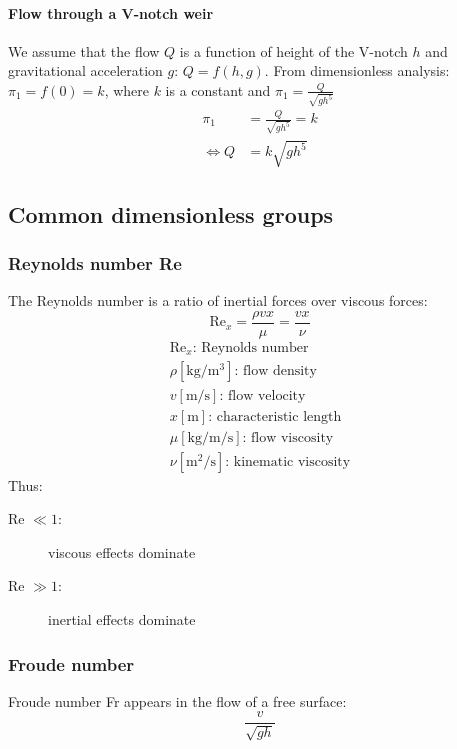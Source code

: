 \documentclass[10pt, twocolumn]{article}
\begin{document}
\paragraph{Flow through a V-notch weir}
We assume that the flow \(Q\) is a function of height of the V-notch \(h\) and gravitational acceleration \(g\): \(Q = f(h, g)\).
From dimensionless analysis: \(\pi_1 = f(0) = k\), where \(k\) is a constant and
\(\pi_1 = \frac{Q}{\sqrt{gh^5}}\)
\[
  \begin{split}
    \pi_1 & = \frac{Q}{\sqrt{gh^5}} = k \\
    \iff Q & = k\sqrt{gh^5}
  \end{split}
\]


\subsection{Common dimensionless groups}
\subsubsection{Reynolds number Re}
The Reynolds number is a ratio of inertial forces over viscous forces:
\[
  \mathrm{Re}_x = \frac{\rho v x}{\mu} = \frac{v x}{\nu}
\]
\[
  \begin{array}{|l}
    \mathrm{Re}_x \text{: Reynolds number}                            \\
    \rho [\si{\kilogram\per\metre\cubed}] \text{: flow density}       \\
    v [\si{\metre\per\second}] \text{: flow velocity}                 \\
    x [\si{\metre}] \text{: characteristic length}                    \\
    \mu [\si{\kilogram\per\meter\per\second}] \text{: flow viscosity} \\
    \nu [\si{\meter\squared\per\second}] \text{: kinematic viscosity}
  \end{array}
\]
Thus:
\begin{description}
  \item[Re \(\ll 1\):] viscous effects dominate
  \item[Re \(\gg 1\):] inertial effects dominate
\end{description}

\subsubsection{Froude number}
Froude number Fr appears in the flow of a free surface:
\[
  \frac{v}{\sqrt{gh}}
\]
\end{document}
